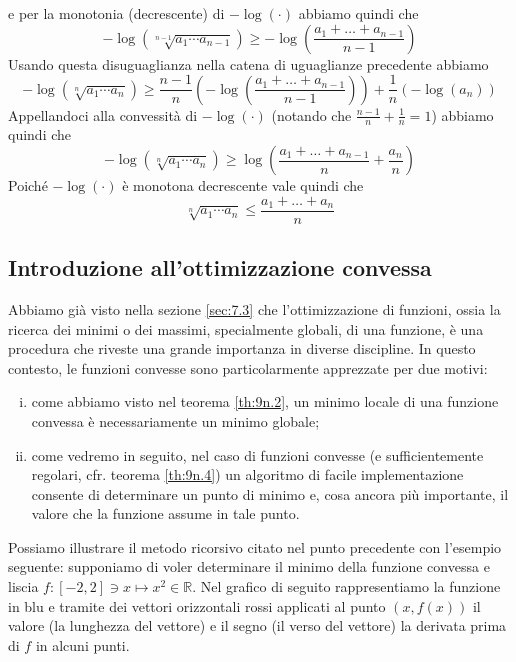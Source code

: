 \begin{example}
\[    \]
    e per la monotonia (decrescente) di $-\log(\cdot)$ abbiamo quindi che
    \[
    -\log(\sqrt[n-1]{a_1 \cdots a_{n-1}}) \ge -\log\left(\frac{a_1 + \dots + a_{n-1}}{n-1}\right)
    \]
    Usando questa disuguaglianza nella catena di uguaglianze precedente abbiamo
    \[
    -\log(\sqrt[n]{a_1 \cdots a_n}) \ge \frac{n-1}{n}\left(-\log\left(\frac{a_1 + \dots + a_{n-1}}{n-1}\right)\right) +\frac{1}{n}(-\log(a_n))
    \]
    Appellandoci alla convessità di $-\log(\cdot)$ (notando che $\frac{n-1}{n}+\frac{1}{n}=1$) abbiamo quindi che
    \[
    -\log(\sqrt[n]{a_1 \cdots a_n}) \ge \log\left(\frac{a_1 + \dots + a_{n-1}}{n}+ \frac{a_n}{n}\right)
    \]
    Poiché $-\log(\cdot)$ è monotona decrescente vale quindi che
    \[
    \sqrt[n]{a_1 \cdots a_n} \le \frac{a_1+\dots + a_n}{n}
    \]
    \end{example}
    \subsection{Introduzione all'ottimizzazione convessa}
    Abbiamo già visto nella sezione \ref{sec:7.3} che l'ottimizzazione di funzioni, ossia la ricerca dei minimi o dei massimi, specialmente globali, di una funzione, è una procedura che riveste una grande importanza in diverse discipline. In questo contesto, le funzioni convesse sono particolarmente apprezzate per due motivi:
    \begin{enumerate}[(i)]
        \item come abbiamo visto nel teorema \ref{th:9n.2}, un minimo locale di una funzione convessa è necessariamente un minimo globale;
        \item come vedremo in seguito, nel caso di funzioni convesse (e sufficientemente regolari, cfr. teorema \ref{th:9n.4}) un algoritmo di facile implementazione consente di determinare un punto di minimo e, cosa ancora più importante, il valore che la funzione assume in tale punto.
    \end{enumerate}
    Possiamo illustrare il metodo ricorsivo citato nel punto precedente con l'esempio seguente: supponiamo di voler determinare il minimo della funzione convessa e liscia $f\colon [-2, 2]\ni x \mapsto x^2\in\mathbb{R}$. Nel grafico di seguito rappresentiamo la funzione in blu e tramite dei vettori orizzontali rossi applicati al punto $(x,f(x))$ il valore (la lunghezza del vettore) e il segno (il verso del vettore) la derivata prima di $f$ in alcuni punti.

